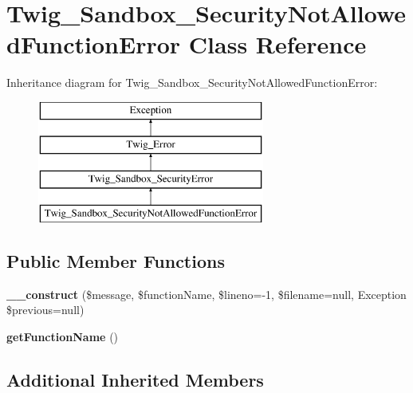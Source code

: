 \hypertarget{class_twig___sandbox___security_not_allowed_function_error}{}\section{Twig\+\_\+\+Sandbox\+\_\+\+Security\+Not\+Allowed\+Function\+Error Class Reference}
\label{class_twig___sandbox___security_not_allowed_function_error}
Inheritance diagram for Twig\+\_\+\+Sandbox\+\_\+\+Security\+Not\+Allowed\+Function\+Error\+:\begin{figure}[H]
\begin{center}
\leavevmode
\includegraphics[height=4.000000cm]{class_twig___sandbox___security_not_allowed_function_error}
\end{center}
\end{figure}
\subsection*{Public Member Functions}
\begin{DoxyCompactItemize}
\item 
\hypertarget{class_twig___sandbox___security_not_allowed_function_error_a298d4f275321abb754e9ec89d847fc4c}{}{\bfseries \+\_\+\+\_\+construct} (\$message, \$function\+Name, \$lineno=-\/1, \$filename=null, Exception \$previous=null)\label{class_twig___sandbox___security_not_allowed_function_error_a298d4f275321abb754e9ec89d847fc4c}

\item 
\hypertarget{class_twig___sandbox___security_not_allowed_function_error_aa07f3ffd609a5269623ad54a64bf04d3}{}{\bfseries get\+Function\+Name} ()\label{class_twig___sandbox___security_not_allowed_function_error_aa07f3ffd609a5269623ad54a64bf04d3}

\end{DoxyCompactItemize}
\subsection*{Additional Inherited Members}


